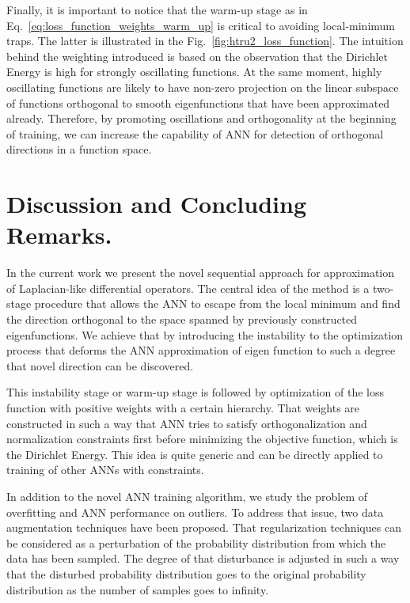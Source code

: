 \documentclass{article}
\theoremstyle{plain}
\theoremstyle{definition}
\theoremstyle{remark}
\begin{document}
Finally, it is important to notice that the warm-up stage as in Eq.~\eqref{eq:loss_function_weights_warm_up} is critical to
avoiding local-minimum traps. The latter is illustrated in the Fig.~\ref{fig:htru2_loss_function}.
The intuition behind the weighting introduced is based on the observation that the Dirichlet Energy
is high for strongly oscillating functions. At the same moment, highly oscillating functions
are likely to have non-zero projection on the linear subspace of functions orthogonal to smooth eigenfunctions
that have been approximated already. Therefore, by promoting oscillations and orthogonality at the beginning of training,
we can increase the capability of ANN for detection of orthogonal directions in a function space.


\section{Discussion and Concluding Remarks.}
\label{sec:conclusion}
In the current work we present the novel sequential approach for approximation of Laplacian-like differential operators.
The central idea of the method is a two-stage procedure that allows the ANN to escape from the local minimum and
find the direction orthogonal to the space spanned by previously constructed eigenfunctions.
We achieve that by introducing the instability to the optimization process that deforms
the ANN approximation of eigen function to such a degree that novel direction can be discovered.

This instability stage or warm-up stage is followed by optimization of the loss function with positive weights with a certain hierarchy.
That weights are constructed in such a way that ANN tries to satisfy orthogonalization and normalization constraints first
before minimizing the objective function, which is the Dirichlet Energy.
This idea is quite generic and can be directly applied to training of other ANNs with constraints.

In addition to the novel ANN training algorithm, we study the problem of overfitting and ANN performance on outliers.
To address that issue, two data augmentation techniques have been proposed.
That regularization techniques can be considered as a perturbation of the probability distribution from which the data has
been sampled. The degree of that disturbance is adjusted in such a way that the disturbed probability distribution goes
to the original probability distribution as the number of samples goes to infinity.
\end{document}
